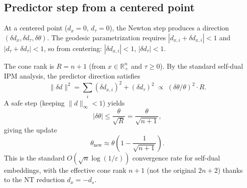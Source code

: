 \documentclass{article}
\newcommand{\R}{\mathbb{R}}
\begin{document}
\subsection{Predictor step from a centered point}

At a centered point ($d_x = 0$, $d_\tau = 0$), the Newton step produces a direction $(\delta d_x, \delta d_\tau, \delta \theta)$. The geodesic parametrization requires $|d_{x,i} + \delta d_{x,i}| < 1$ and $|d_\tau + \delta d_\tau| < 1$, so from centering: $|\delta d_{x,i}| < 1$, $|\delta d_\tau| < 1$.

The cone rank is $R = n + 1$ (from $x \in \R^n_+$ and $\tau \geq 0$). By the standard self-dual IPM analysis, the predictor direction satisfies
\[
  \|\delta d\|^2 = \sum_i (\delta d_{x,i})^2 + (\delta d_\tau)^2 \;\propto\; (\delta \theta / \theta)^2 \cdot R.
\]
A safe step (keeping $\|d\|_\infty < 1$) yields
\[
  |\delta \theta| \leq \frac{\theta}{\sqrt{R}} = \frac{\theta}{\sqrt{n+1}},
\]
giving the update
\begin{equation} \label{eq:theta_update}
  \boxed{\theta_{\mathrm{new}} \approx \theta \left(1 - \frac{1}{\sqrt{n+1}}\right).}
\end{equation}
This is the standard $O(\sqrt{n} \log(1/\varepsilon))$ convergence rate for self-dual embeddings, with the effective cone rank $n + 1$ (not the original $2n + 2$) thanks to the NT reduction $d_x = -d_s$.
\end{document}
